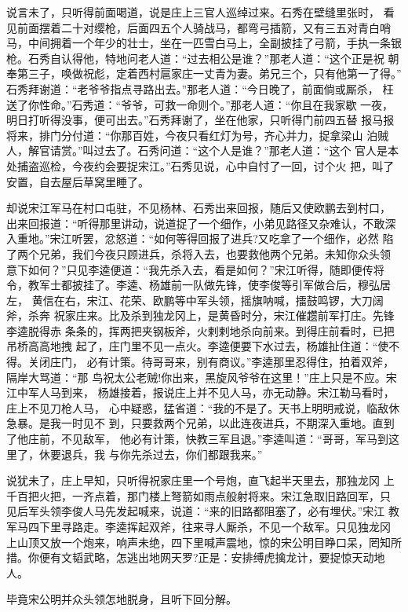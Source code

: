 说言未了，只听得前面喝道，说是庄上三官人巡绰过来。石秀在壁缝里张时，
看见前面摆着二十对缨枪，后面四五个人骑战马，都弯弓插箭，又有三五对青白哨
马，中间拥着一个年少的壮士，坐在一匹雪白马上，全副披挂了弓箭，手执一条银
枪。石秀自认得他，特地问老人道：“过去相公是谁？”那老人道：“这个正是祝
朝奉第三子，唤做祝彪，定着西村扈家庄一丈青为妻。弟兄三个，只有他第一了得。”
石秀拜谢道：“老爷爷指点寻路出去。”那老人道：“今日晚了，前面倘或厮杀，
枉送了你性命。”石秀道：“爷爷，可救一命则个。”那老人道：“你且在我家歇
一夜，明日打听得没事，便可出去。”石秀拜谢了，坐在他家，只听得门前四五替
报马报将来，排门分付道：“你那百姓，今夜只看红灯为号，齐心并力，捉拿梁山
泊贼人，解官请赏。”叫过去了。石秀问道：“这个人是谁？”那老人道：“这个
官人是本处捕盗巡检，今夜约会要捉宋江。”石秀见说，心中自忖了一回，讨个火
把，叫了安置，自去屋后草窝里睡了。

却说宋江军马在村口屯驻，不见杨林、石秀出来回报，随后又使欧鹏去到村口，
出来回报道：“听得那里讲动，说道捉了一个细作，小弟见路径又杂难认，不敢深
入重地。”宋江听罢，忿怒道：“如何等得回报了进兵?又吃拿了一个细作，必然
陷了两个兄弟，我们今夜只顾进兵，杀将入去，也要救他两个兄弟。未知你众头领
意下如何？”只见李逵便道：“我先杀入去，看是如何？”宋江听得，随即便传将
令，教军士都披挂了。李逵、杨雄前一队做先锋，使李俊等引军做合后，穆弘居左，
黄信在右，宋江、花荣、欧鹏等中军头领，摇旗呐喊，擂鼓鸣锣，大刀阔斧，杀奔
祝家庄来。比及杀到独龙冈上，是黄昏时分，宋江催趱前军打庄。先锋李逵脱得赤
条条的，挥两把夹钢板斧，火剌剌地杀向前来。到得庄前看时，已把吊桥高高地拽
起了，庄门里不见一点火。李逵便要下水过去，杨雄扯住道：“使不得。关闭庄门，
必有计策。待哥哥来，别有商议。”李逵那里忍得住，拍着双斧，隔岸大骂道：“那
鸟祝太公老贼!你出来，黑旋风爷爷在这里！”庄上只是不应。宋江中军人马到来，
杨雄接着，报说庄上并不见人马，亦无动静。宋江勒马看时，庄上不见刀枪人马，
心中疑惑，猛省道：“我的不是了。天书上明明戒说，临敌休急暴。是我一时见不
到，只要救两个兄弟，以此连夜进兵，不期深入重地。直到了他庄前，不见敌军，
他必有计策，快教三军且退。”李逵叫道：“哥哥，军马到这里了，休要退兵，我
与你先杀过去，你们都跟我来。”

说犹未了，庄上早知，只听得祝家庄里一个号炮，直飞起半天里去，那独龙冈
上千百把火把，一齐点着，那门楼上弩箭如雨点般射将来。宋江急取旧路回军，只
见后军头领李俊人马先发起喊来，说道：“来的旧路都阻塞了，必有埋伏。”宋江
教军马四下里寻路走。李逵挥起双斧，往来寻人厮杀，不见一个敌军。只见独龙冈
上山顶又放一个炮来，响声未绝，四下里喊声震地，惊的宋公明目睁口呆，罔知所
措。你便有文韬武略，怎逃出地网天罗?正是：安排缚虎擒龙计，要捉惊天动地人。

毕竟宋公明并众头领怎地脱身，且听下回分解。